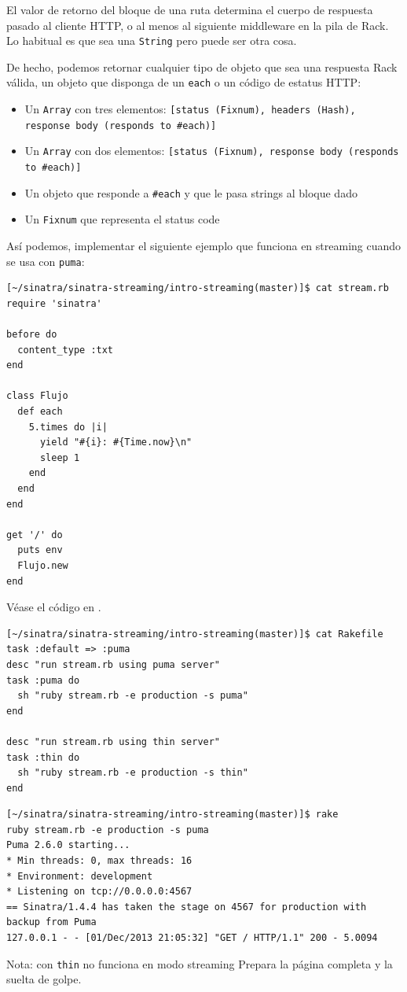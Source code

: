 El valor de retorno del bloque de una ruta determina
el cuerpo de respuesta pasado al cliente HTTP, o al menos al siguiente middleware en la pila de Rack.
Lo habitual es que sea una \verb|String| pero puede ser otra cosa.

De hecho, podemos retornar cualquier tipo de objeto que sea una respuesta Rack válida,
un objeto que disponga de un \verb|each| o un código de estatus HTTP:

\begin{itemize}
\item
Un \verb|Array| con tres elementos: \verb|[status (Fixnum), headers (Hash), response body (responds to #each)]|

\item
Un \verb|Array| con dos elementos:
 \verb|[status (Fixnum), response body (responds to #each)]|

\item
Un objeto que responde a \verb|#each| y que le pasa strings al bloque dado

\item
Un \verb|Fixnum| que representa el status code
\end{itemize}

Así podemos, implementar el siguiente ejemplo que funciona en streaming cuando se usa con 
\verb|puma|:

\begin{verbatim}
[~/sinatra/sinatra-streaming/intro-streaming(master)]$ cat stream.rb 
require 'sinatra'

before do
  content_type :txt
end

class Flujo
  def each
    5.times do |i| 
      yield "#{i}: #{Time.now}\n"
      sleep 1
    end
  end
end

get '/' do
  puts env
  Flujo.new
end
\end{verbatim}
Véase el código en
.

\begin{verbatim}
[~/sinatra/sinatra-streaming/intro-streaming(master)]$ cat Rakefile 
task :default => :puma
desc "run stream.rb using puma server"
task :puma do
  sh "ruby stream.rb -e production -s puma"
end

desc "run stream.rb using thin server"
task :thin do
  sh "ruby stream.rb -e production -s thin"
end
\end{verbatim}

\begin{verbatim}
[~/sinatra/sinatra-streaming/intro-streaming(master)]$ rake
ruby stream.rb -e production -s puma
Puma 2.6.0 starting...
* Min threads: 0, max threads: 16
* Environment: development
* Listening on tcp://0.0.0.0:4567
== Sinatra/1.4.4 has taken the stage on 4567 for production with backup from Puma
127.0.0.1 - - [01/Dec/2013 21:05:32] "GET / HTTP/1.1" 200 - 5.0094
\end{verbatim}
Nota: con \verb|thin| no funciona en modo streaming Prepara la página completa y la suelta
de golpe.

